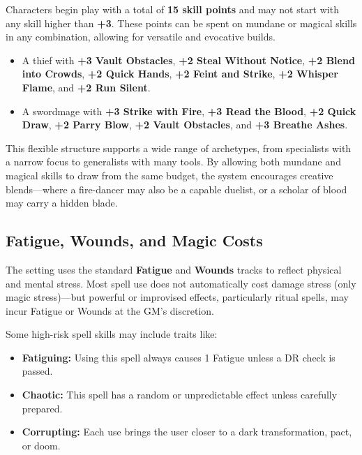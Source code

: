 Characters begin play with a total of \textbf{15 skill points} and may not start with any skill higher than \textbf{+3}. These points can be spent on mundane or magical skills in any combination, allowing for versatile and evocative builds.

\begin{itemize}\raggedright
    \item A thief with \textbf{+3 Vault Obstacles}, \textbf{+2 Steal Without Notice}, \textbf{+2 Blend into Crowds}, \textbf{+2 Quick Hands}, \textbf{+2 Feint and Strike}, \textbf{+2 Whisper Flame}, and \textbf{+2 Run Silent}.
    
    \item A swordmage with \textbf{+3 Strike with Fire}, \textbf{+3 Read the Blood}, \textbf{+2 Quick Draw}, \textbf{+2 Parry Blow}, \textbf{+2 Vault Obstacles}, and \textbf{+3 Breathe Ashes}.
\end{itemize}

This flexible structure supports a wide range of archetypes, from specialists with a narrow focus to generalists with many tools. By allowing both mundane and magical skills to draw from the same budget, the system encourages creative blends—where a fire-dancer may also be a capable duelist, or a scholar of blood may carry a hidden blade.

\subsection{Fatigue, Wounds, and Magic Costs}

The setting uses the standard \textbf{Fatigue} and \textbf{Wounds} tracks to reflect physical and mental stress. Most spell use does not automatically cost damage stress (only magic stress)—but powerful or improvised effects, particularly ritual spells, may incur Fatigue or Wounds at the GM’s discretion.

Some high-risk spell skills may include traits like:

\begin{itemize}
    \item \textbf{Fatiguing:} Using this spell always causes 1 Fatigue unless a DR check is passed.
    \item \textbf{Chaotic:} This spell has a random or unpredictable effect unless carefully prepared.
    \item \textbf{Corrupting:} Each use brings the user closer to a dark transformation, pact, or doom.
\end{itemize}

